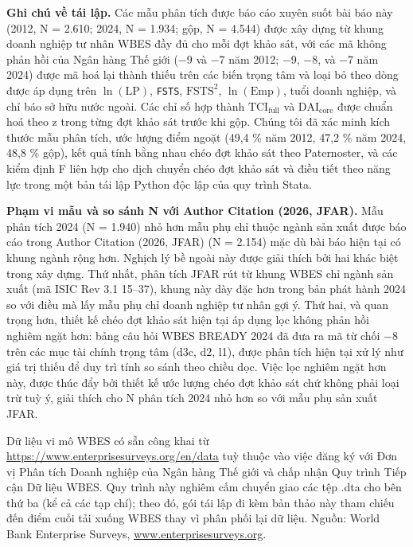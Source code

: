 \documentclass[12pt,a4paper]{article}
\begin{document}
\textbf{Ghi chú về tái lập.} Các mẫu phân tích được báo cáo xuyên suốt
bài báo này (2012, N = 2.610; 2024, N = 1.934; gộp, N = 4.544) được xây
dựng từ khung doanh nghiệp tư nhân WBES đầy đủ cho mỗi đợt khảo sát, với
các mã không phản hồi của Ngân hàng Thế giới (−9 và −7 năm 2012; −9, −8,
và −7 năm 2024) được mã hoá lại thành thiếu trên các biến trọng tâm và
loại bỏ theo dòng được áp dụng trên \(\ln(\mathrm{LP})\), \texttt{FSTS},
\(\mathrm{FSTS}^2\), \(\ln(\mathrm{Emp})\), tuổi doanh nghiệp, và chỉ
báo sở hữu nước ngoài. Các chỉ số hợp thành
\(\mathrm{TCI}_{\text{full}}\) và \(\mathrm{DAI}_{\text{core}}\) được
chuẩn hoá theo z trong từng đợt khảo sát trước khi gộp. Chúng tôi đã xác
minh kích thước mẫu phân tích, ước lượng điểm ngoặt (49,4 \% năm 2012,
47,2 \% năm 2024, 48,8 \% gộp), kết quả tính bằng nhau chéo đợt khảo sát
theo Paternoster, và các kiểm định F liên hợp cho dịch chuyển chéo đợt
khảo sát và điều tiết theo năng lực trong một bản tái lập Python độc lập
của quy trình Stata.

\textbf{Phạm vi mẫu và so sánh N với Author Citation (2026, JFAR).} Mẫu
phân tích 2024 (N = 1.940) nhỏ hơn mẫu phụ chỉ thuộc ngành sản xuất được
báo cáo trong Author Citation (2026, JFAR) (N = 2.154) mặc dù bài báo
hiện tại có khung ngành rộng hơn. Nghịch lý bề ngoài này được giải thích
bởi hai khác biệt trong xây dựng. Thứ nhất, phân tích JFAR rút từ khung
WBES chỉ ngành sản xuất (mã ISIC Rev 3.1 15--37), khung này dày đặc hơn
trong bản phát hành 2024 so với điều mà lấy mẫu phụ chỉ doanh nghiệp tư
nhân gợi ý. Thứ hai, và quan trọng hơn, thiết kế chéo đợt khảo sát hiện
tại áp dụng lọc không phản hồi nghiêm ngặt hơn: bảng câu hỏi WBES BREADY
2024 đã đưa ra mã từ chối −8 trên các mục tài chính trọng tâm (d3c, d2,
l1), được phân tích hiện tại xử lý như giá trị thiếu để duy trì tính so
sánh theo chiều dọc. Việc lọc nghiêm ngặt hơn này, được thúc đẩy bởi
thiết kế ước lượng chéo đợt khảo sát chứ không phải loại trừ tuỳ ý, giải
thích cho N phân tích 2024 nhỏ hơn so với mẫu phụ sản xuất JFAR.

Dữ liệu vi mô WBES có sẵn công khai từ
\url{https://www.enterprisesurveys.org/en/data} tuỳ thuộc vào việc đăng
ký với Đơn vị Phân tích Doanh nghiệp của Ngân hàng Thế giới và chấp nhận
Quy trình Tiếp cận Dữ liệu WBES. Quy trình này nghiêm cấm chuyển giao
các tệp .dta cho bên thứ ba (kể cả các tạp chí); theo đó, gói tái lập đi
kèm bản thảo này tham chiếu đến điểm cuối tải xuống WBES thay vì phân
phối lại dữ liệu. Nguồn: World Bank Enterprise Surveys,
\href{http://www.enterprisesurveys.org}{www.enterprisesurveys.org}.
\end{document}
